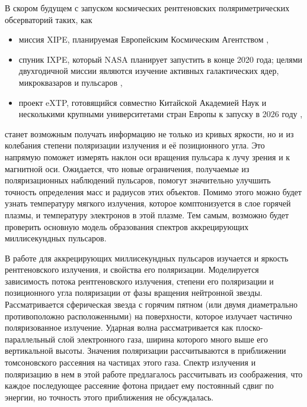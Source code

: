 \documentclass[14pt,a4paper]{extarticle}
\begin{document}
		В скором будущем с запуском космических рентгеновских поляриметрических обсерваторий таких, как \begin{itemize}
			\item миссия XIPE, планируемая Европейским Космическим Агентством \cite{XIPE}, 
			\item спуник IXPE, который NASA планирует запустить в конце 2020 года; целями двухгодичной миссии являются изучение активных галактических ядер, микроквазаров и пульсаров \cite{IXPE},
			\item проект eXTP, готовящийся совместно Китайской Академией Наук и несколькими крупными университетами стран Европы к запуску в 2026 году 
			\cite{eXTP},
		\end{itemize}
		станет возможным получать информацию не только из кривых яркости, но и из колебания степени поляризации излучения и её позиционного угла.
		Это напрямую поможет измерять наклон оси вращения пульсара к лучу зрения и к магнитной оси. 
		Ожидается, что новые ограничения, получаемые из поляризационных наблюдений пульсаров, помогут значительно улучшить точность определения масс и радиусов этих объектов.
		Помимо этого можно будет узнать температуру мягкого излучения, которое комптонизуется в слое горячей плазмы, и температуру электронов в этой плазме. 
		Тем самым, возможно будет проверить основную модель образования спектров аккрецирующих миллисекундных пульсаров.

		В работе \cite{Viironen2004} для аккрецирующих миллисекундных пульсаров изучается и яркость рентгеновского излучения, и свойства его поляризации.
		Моделируется зависимость потока рентгеновского излучения, степени его поляризации и позиционного угла поляризации от фазы вращения нейтронной звезды.
		Рассматривается сферическая звезда с горячим пятном (или двумя диаметрально противоположно расположенными) на поверхности, которое излучает частично поляризованное излучение. 
		Ударная волна рассматривается как плоско-параллельный слой электронного газа, ширина которого много выше его вертикальной высоты. 
		Значения поляризации рассчитываются в приближении томсоновского рассеяния на частицах этого газа. 
		Спектр излучения и поляризацию в нем в этой работе предлагалось рассчитывать из соображения, что каждое последующее рассеяние фотона придает ему постоянный сдвиг по энергии, но точность этого приближения не обсуждалась.  

		
\end{document}
